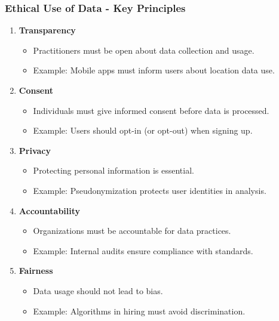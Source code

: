 \documentclass[aspectratio=169]{beamer}
\begin{document}
\begin{frame}[fragile]
    \frametitle{Ethical Use of Data - Key Principles}
    \begin{enumerate}
        \item \textbf{Transparency}
            \begin{itemize}
                \item Practitioners must be open about data collection and usage.
                \item Example: Mobile apps must inform users about location data use.
            \end{itemize}
        
        \item \textbf{Consent}
            \begin{itemize}
                \item Individuals must give informed consent before data is processed.
                \item Example: Users should opt-in (or opt-out) when signing up.
            \end{itemize}
        
        \item \textbf{Privacy}
            \begin{itemize}
                \item Protecting personal information is essential.
                \item Example: Pseudonymization protects user identities in analysis.
            \end{itemize}
        
        \item \textbf{Accountability}
            \begin{itemize}
                \item Organizations must be accountable for data practices.
                \item Example: Internal audits ensure compliance with standards.
            \end{itemize}
        
        \item \textbf{Fairness}
            \begin{itemize}
                \item Data usage should not lead to bias.
                \item Example: Algorithms in hiring must avoid discrimination.
            \end{itemize}
    \end{enumerate}
\end{frame}
\end{document}
